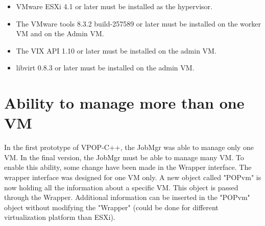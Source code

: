 \begin{itemize}


\item VMware ESXi 4.1 or later must be installed as the hypervisor.
\item The VMware tools 8.3.2 build-257589 or later must be installed on the worker VM and on the Admin VM.
\item The VIX API 1.10 or later must be installed on the admin VM.
\item libvirt 0.8.3 or later must be installed on the admin VM.
\end{itemize} 


\section{Ability to manage more than one VM}
In the first prototype of VPOP-C++, the JobMgr was able to manage only one VM. In the final version, the JobMgr must be able to manage many VM. To enable this ability, some change have been made in the Wrapper interface. The wrapper interface was designed for one VM only. A new object called "POPvm" is now holding all the information about a specific VM. This object is passed through the Wrapper. Additional information can be inserted in the "POPvm" object without modifying the "Wrapper" (could be done for different virtualization platform than ESXi). 